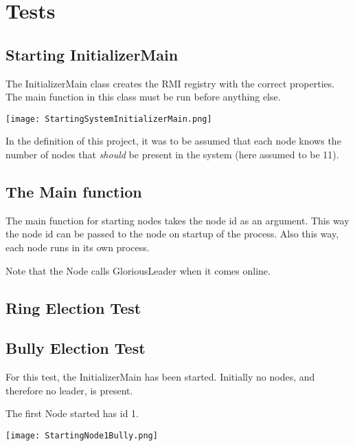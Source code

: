 \section{Tests}
\subsection{Starting InitializerMain}
The InitializerMain class creates the RMI registry with the correct properties. The main function in this class must be run before anything else. 

\begin{center}
	\texttt{[image: StartingSystemInitializerMain.png]}
\end{center}

In the definition of this project, it was to be assumed that each node knows the number of nodes that \textit{should} be present in the system (here assumed to be 11).

\subsection{The Main function}
The main function for starting nodes takes the node id as an argument. This way the node id can be passed to the node on startup of the process. Also this way, each node runs in its own process.

\begin{center}
\end{center}

Note that the Node calls GloriousLeader when it comes online. 

\subsection{Ring Election Test}

\subsection{Bully Election Test}
For this test, the InitializerMain has been started. Initially no nodes, and therefore no leader, is present. 

The first Node started has id 1.

\begin{center}
	\texttt{[image: StartingNode1Bully.png]}
\end{center}

